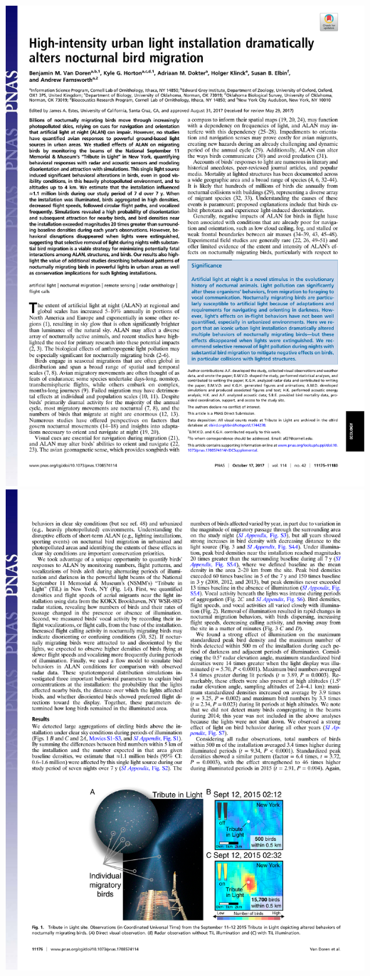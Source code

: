 \documentclass[a4paper, twoside]{templates/ociamthesis}
\begin{document}
\includegraphics[width=1\linewidth]{pdf_chapters/lights/lights_crop_Part1}
\includegraphics[width=1\linewidth]{pdf_chapters/lights/lights_crop_Part2}
\end{document}

